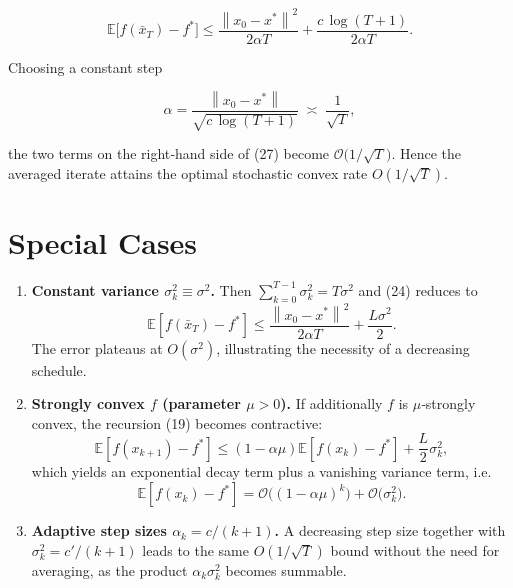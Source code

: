 \documentclass[11pt]{article}
\newcommand{\E}{\mathbb{E}}
\newcommand{\norm}[1]{\left\|#1\right\|}
\begin{document}
\[
\E\!\bigl[f(\bar{x}_{T})-f^{*}\bigr]\le
\frac{\norm{x_{0}-x^{*}}^{2}}{2\alpha T}
+\frac{c\,\log (T+1)}{2\alpha T}.
\tag{27}
\]

Choosing a constant step  

\[
\alpha = \frac{\norm{x_{0}-x^{*}}}{\sqrt{c\,\log (T+1)}}
\; \asymp\; \frac{1}{\sqrt{T}},
\tag{28}
\]

the two terms on the right‑hand side of (27) become
$\mathcal{O}\!\bigl(1/\sqrt{T}\bigr)$. Hence the averaged iterate attains the
optimal stochastic convex rate $O(1/\sqrt{T})$.

\section*{Special Cases}
\begin{enumerate}
\item \textbf{Constant variance $\sigma_{k}^{2}\equiv\sigma^{2}$.}  
Then $\sum_{k=0}^{T-1}\sigma_{k}^{2}=T\sigma^{2}$ and (24) reduces to  
\[
\E[f(\bar{x}_{T})-f^{*}]\le
\frac{\norm{x_{0}-x^{*}}^{2}}{2\alpha T}
+\frac{L\sigma^{2}}{2}.
\]
The error plateaus at $O(\sigma^{2})$, illustrating the necessity of a
decreasing schedule.

\item \textbf{Strongly convex $f$ (parameter $\mu>0$).}  
If additionally $f$ is $\mu$‑strongly convex, the recursion (19) becomes
contractive:
\[
\E[f(x_{k+1})-f^{*}]
\le (1-\alpha\mu)\E[f(x_{k})-f^{*}]
+\frac{L}{2}\sigma_{k}^{2},
\]
which yields an exponential decay term plus a vanishing variance term,
i.e.  
\[
\E[f(x_{k})-f^{*}]=\mathcal{O}\!\bigl((1-\alpha\mu)^{k}\bigr)
+\mathcal{O}\!\bigl(\sigma_{k}^{2}\bigr).
\]

\item \textbf{Adaptive step sizes $\alpha_{k}=c/(k+1)$.}  
A decreasing step size together with $\sigma_{k}^{2}=c'/(k+1)$ leads to the
same $O(1/\sqrt{T})$ bound without the need for averaging, as the
product $\alpha_{k}\sigma_{k}^{2}$ becomes summable.
\end{enumerate}

\end{document}
